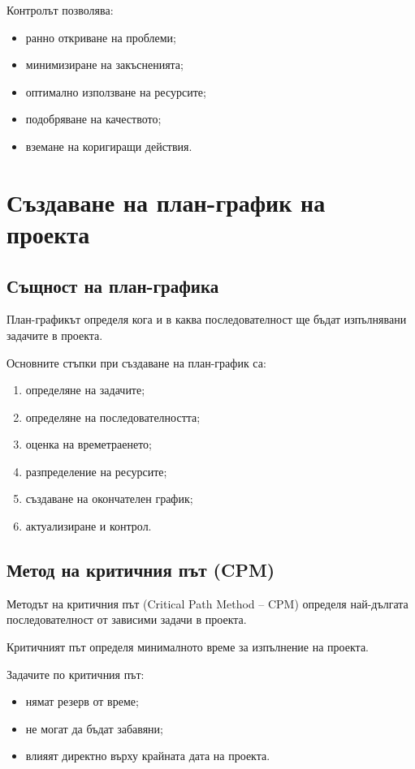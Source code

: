 \documentclass{scrartcl}
\begin{document}
\begin{FlushLeft}
Контролът позволява:

\begin{itemize}
    \item ранно откриване на проблеми;
    \item минимизиране на закъсненията;
    \item оптимално използване на ресурсите;
    \item подобряване на качеството;
    \item вземане на коригиращи действия.
\end{itemize}

\section{Създаване на план-график на проекта}

\subsection{Същност на план-графика}

План-графикът определя кога и в каква последователност ще бъдат изпълнявани задачите в проекта.

Основните стъпки при създаване на план-график са:

\begin{enumerate}
    \item определяне на задачите;
    \item определяне на последователността;
    \item оценка на времетраенето;
    \item разпределение на ресурсите;
    \item създаване на окончателен график;
    \item актуализиране и контрол.
\end{enumerate}

\subsection{Метод на критичния път (CPM)}

Методът на критичния път (Critical Path Method – CPM) определя най-дългата последователност от зависими задачи в проекта.

Критичният път определя минималното време за изпълнение на проекта.

Задачите по критичния път:

\begin{itemize}
    \item нямат резерв от време;
    \item не могат да бъдат забавяни;
    \item влияят директно върху крайната дата на проекта.
\end{itemize}


\end{FlushLeft}
\end{document}
